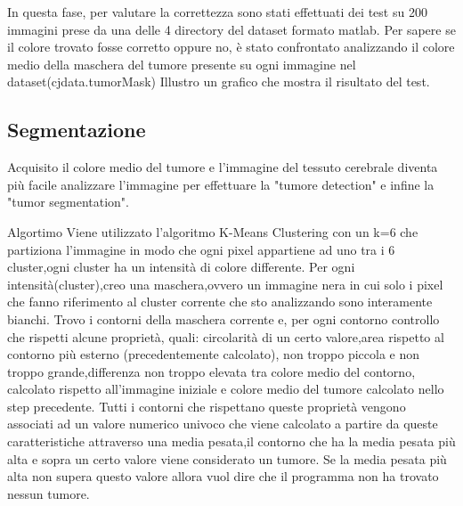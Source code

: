 \documentclass{article}
\begin{document}
In questa fase, per valutare la correttezza sono stati effettuati dei test su 200 immagini prese da una delle 4 directory del dataset formato matlab.
Per sapere se il colore trovato fosse corretto oppure no, è stato confrontato analizzando il colore medio della maschera del tumore presente su ogni immagine nel dataset(cjdata.tumorMask)
Illustro un grafico che mostra il risultato del test.

\clearpage

\subsection{Segmentazione}
Acquisito il colore medio del tumore e l'immagine del tessuto cerebrale diventa più facile analizzare l'immagine per effettuare la "tumore detection" e infine la "tumor segmentation".

\begin{my theorem}{Algortimo}
    Viene utilizzato l'algoritmo K-Means Clustering con un k=6 che partiziona l'immagine in modo che ogni pixel appartiene ad uno tra i 6 cluster,ogni cluster ha un intensità di colore differente.
    Per ogni intensità(cluster),creo una maschera,ovvero un immagine nera in cui solo i pixel che fanno riferimento al cluster corrente che sto analizzando sono interamente bianchi.
    Trovo i contorni della maschera corrente e, per ogni contorno controllo che rispetti alcune proprietà, quali: circolarità di un certo valore,area rispetto al contorno più esterno (precedentemente calcolato), non troppo piccola e non troppo grande,differenza non troppo elevata tra colore medio del contorno, calcolato rispetto all'immagine iniziale e colore medio del tumore calcolato nello step precedente.
    Tutti i contorni che rispettano queste proprietà vengono associati ad un valore numerico univoco che viene calcolato a partire da queste caratteristiche attraverso una media pesata,il contorno che ha la media pesata più alta e sopra un certo valore viene considerato un tumore.
    Se la media pesata più alta non supera questo valore allora vuol dire che il programma non ha trovato nessun tumore.
\end{my theorem}
\end{document}

